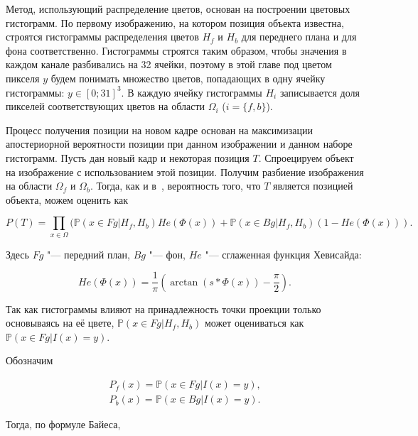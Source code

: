 Метод, использующий распределение цветов, основан на построении цветовых
гистограмм.
По первому изображению, на котором позиция объекта известна, строятся
гистограммы распределения цветов $H_f$ и $H_b$ для переднего плана и для фона
соответственно.
Гистограммы строятся таким образом, чтобы значения в каждом канале разбивались
на 32 ячейки, поэтому в этой главе под цветом пикселя $y$ будем понимать
множество цветов, попадающих в одну ячейку гистограммы: $y \in [0; 31]^3$.
В каждую ячейку гистограммы $H_i$ записывается доля пикселей соответствующих
цветов на области $\Omega_i$ ($i = \{f, b\}$).

Процесс получения позиции на новом кадре основан на максимизации апостериорной
вероятности позиции при данном изображении и данном
наборе гистограмм.
Пусть дан новый кадр и некоторая позиция $T$.
Спроецируем объект на изображение с использованием этой позиции.
Получим разбиение изображения на области $\Omega_f$ и $\Omega_b$.
Тогда, как и в~\cite{Hexner2016}, вероятность того, что $T$
является позицией объекта, можем оценить как

\begin{equation}
\label{eqn:pos_prob}
P(T) = \prod\limits_{x \in \Omega}(\mathbb{P}(x \in Fg | H_f, H_b) He(\Phi(x))
+ \mathbb{P}(x \in Bg|H_f, H_b)(1 - He(\Phi(x)))
\text{.}
\end{equation}


Здесь $Fg$ "--- передний план, $Bg$ "--- фон, $He$ "--- сглаженная функция
Хевисайда:

\begin{equation}
\label{eqn:heaviside}
    He(\Phi(x)) = \frac{1}{\pi} (\arctan(s * \Phi(x)) - \frac{\pi}{2})
\text{.}
\end{equation}

Так как гистограммы влияют на принадлежность точки проекции только основываясь
на её цвете,
$\mathbb{P}(x \in Fg | H_f, H_b)$
может оцениваться как
$\mathbb{P}(x \in Fg | I(x) = y)$.

Обозначим

\begin{equation}
\label{eqn:Pfx}
\begin{array}{c}
P_f(x) = \mathbb{P}(x \in Fg | I(x) = y) \text{,} \\
P_b(x) = \mathbb{P}(x \in Bg | I(x) = y) \text{.}
\end{array}
\end{equation}

Тогда, по формуле Байеса,

